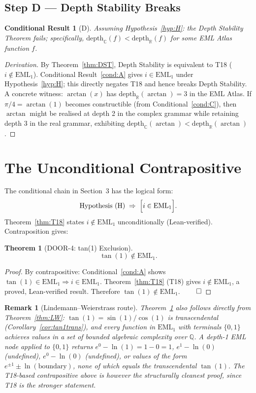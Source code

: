\documentclass[11pt]{article}
\newtheorem{theorem}{Theorem}
\newtheorem{remark}{Remark}
\newtheorem{conditional}{Conditional Result}
\newcommand{\EML}[1]{\mathrm{EML}_{#1}}
\newcommand{\depthR}{\mathrm{depth}_{\mathbb{R}}}
\newcommand{\depthC}{\mathrm{depth}_{\mathbb{C}}}
\begin{document}
\subsection{Step D — Depth Stability Breaks}

\begin{conditional}[D]\label{cond:D}
\emph{Assuming Hypothesis~\ref{hyp:H}:} the Depth Stability Theorem fails;
specifically, $\depthC(f) < \depthR(f)$ for some EML Atlas function $f$.
\end{conditional}

\begin{proof}[Derivation]
By Theorem~\ref{thm:DST}, Depth Stability is equivalent to T18 ($i \notin
\EML{1}$).  Conditional Result~\ref{cond:A} gives $i \in \EML{1}$ under
Hypothesis~\ref{hyp:H}; this directly negates T18 and hence breaks Depth
Stability.  A concrete witness: $\arctan(x)$ has $\depthR(\arctan) = 3$ in the
EML Atlas.  If $\pi/4 = \arctan(1)$ becomes constructible (from
Conditional~\ref{cond:C}), then $\arctan$ might be realised at depth 2 in the
complex grammar while retaining depth 3 in the real grammar, exhibiting
$\depthC(\arctan) < \depthR(\arctan)$.
\end{proof}

\section{The Unconditional Contrapositive}

The conditional chain in Section~3 has the logical form:
\[
  \text{Hypothesis~(H)} \;\Rightarrow\;
  \Bigl[ i \in \EML{1} \Bigr].
\]
Theorem~\ref{thm:T18} states $i \notin \EML{1}$ unconditionally (Lean-verified).
Contraposition gives:

\begin{theorem}[DOOR-4: tan(1) Exclusion]\label{thm:DOOR4}
\[
  \tan(1) \notin \EML{1}.
\]
\end{theorem}

\begin{proof}
By contrapositive: Conditional~\ref{cond:A} shows
$\tan(1) \in \EML{1} \Rightarrow i \in \EML{1}$.
Theorem~\ref{thm:T18} (T18) gives $i \notin \EML{1}$, a proved,
Lean-verified result.  Therefore $\tan(1) \notin \EML{1}$. $\qed$
\end{proof}

\begin{remark}[Lindemann–Weierstrass route]
Theorem~\ref{thm:DOOR4} also follows directly from
Theorem~\ref{thm:LW}: $\tan(1) = \sin(1)/\cos(1)$ is transcendental
(Corollary~\ref{cor:tan1trans}), and every function in $\EML{1}$ with
terminals $\{0,1\}$ achieves values in a set of bounded algebraic complexity
over $\mathbb{Q}$.  A depth-1 EML node applied to $\{0,1\}$ returns
$e^0 - \ln(1) = 1 - 0 = 1$, $e^1 - \ln(0)$ (undefined), $e^0 - \ln(0)$
(undefined), or values of the form $e^{\pm 1} \pm \ln(\text{boundary})$, none
of which equals the transcendental $\tan(1)$.  The T18-based contrapositive
above is however the structurally cleanest proof, since T18 is the stronger
statement.
\end{remark}
\end{document}
